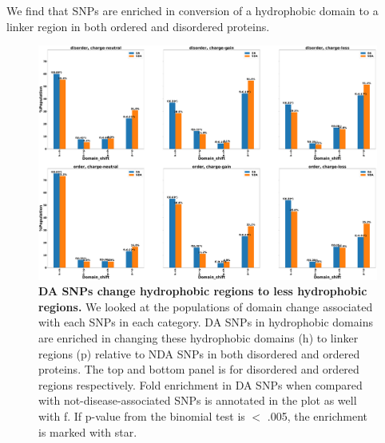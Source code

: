 \documentclass[10pt,letterpaper]{article}
\begin{document}
We find that SNPs are enriched in conversion of a hydrophobic domain to a linker region in both ordered and disordered proteins. 
\begin{figure}[!ht]
\includegraphics[scale=0.1,width=\textwidth,trim={0 0cm 0 0cm},clip]{./figures/charge_vs_no_charge_order_vs_disorder_SNP_Domain_shift.pdf}
\caption{{\bf DA SNPs change hydrophobic regions to less hydrophobic regions.} We looked at the populations of domain change associated with each SNPs in each category. DA SNPs in hydrophobic domains are enriched in changing these hydrophobic domains (h) to linker regions (p) relative to NDA SNPs in both disordered and ordered proteins. The top and bottom panel is for disordered and ordered regions respectively. Fold enrichment in DA SNPs when compared with not-disease-associated SNPs is annotated in the plot as well with f. If p-value from the binomial test is $<$ .005, the enrichment is marked with star.}
\label{fig6} 
\end{figure}


\clearpage
\end{document}

